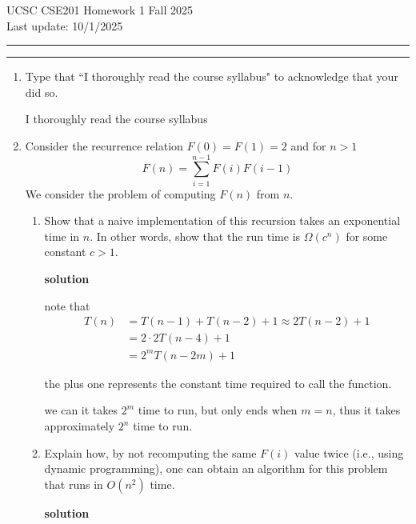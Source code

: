 \documentclass[letterpaper,12pt]{article}
\begin{document}
\noindent
 UCSC CSE201 Homework 1 \hfill Fall 2025 \\
Last update: 10/1/2025 \\
 \rule{\textwidth}{0.5pt}

% 

\enlargethispage*{1.5cm}

\noindent
 \rule{\textwidth}{0.5pt}




\begin{enumerate}

\item Type that ``I thoroughly read the course syllabus" to acknowledge that your did so. 

I thoroughly read the course syllabus


\item
Consider the recurrence relation
$F(0)=F(1)=2$ and for $n>1$
$$F(n)= \sum_{i=1}^{n-1} F(i) F(i-1)$$
We consider the problem of computing $F(n)$ from $n$.

\begin{enumerate}


\item
Show that a naive implementation of this recursion takes an exponential time in $n$. In other words,
show that the run time is $\Omega(c^n)$ for some constant $c  > 1$.

\textbf{solution}

note that \begin{equation}\begin{split}
        T(n) &= T(n-1) + T(n-2) +1\approx 2T(n-2)+1\\
        &= 2\cdot 2 T(n-4)+1\\
        &= 2^m T(n-2m)+1
\end{split}
\end{equation}

the plus one represents the constant time required to  call the function.

we can it takes \(2^m\) time to run, but only ends when \(m=n\), thus it takes approximately \(2^n\) time to run.







\item Explain how, by not recomputing the same $F(i)$ value twice (i.e., using dynamic programming),
one can obtain an algorithm for this problem that runs in $O(n^2)$ 
time. 

\textbf{solution}


\end{enumerate}
\end{enumerate}
\end{document}
